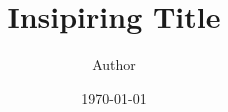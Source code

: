 \documentclass[11pt, oneside]{book}
\begin{document}
\title{Insipiring Title}
\author{Author}
\date{\today}
\maketitle

\tableofcontents

\frontmatter

\mainmatter







\backmatter
\printbibliography %
\end{document}
